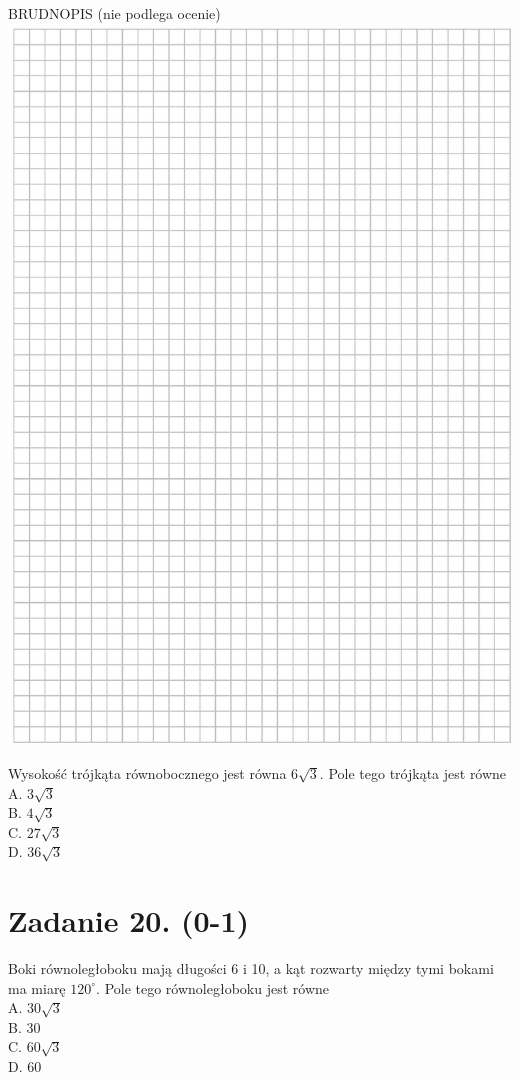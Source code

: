 \documentclass[10pt]{article}
\begin{document}
BRUDNOPIS (nie podlega ocenie)\\
\includegraphics[max width=\textwidth, center]{2024_11_21_465acd0c12fa3e05e8a7g-11}

Wysokość trójkąta równobocznego jest równa \(6 \sqrt{3}\). Pole tego trójkąta jest równe\\
A. \(3 \sqrt{3}\)\\
B. \(4 \sqrt{3}\)\\
C. \(27 \sqrt{3}\)\\
D. \(36 \sqrt{3}\)

\section*{Zadanie 20. (0-1)}
Boki równoległoboku mają długości 6 i 10, a kąt rozwarty między tymi bokami ma miarę \(120^{\circ}\). Pole tego równoległoboku jest równe\\
A. \(30 \sqrt{3}\)\\
B. 30\\
C. \(60 \sqrt{3}\)\\
D. 60
\end{document}
